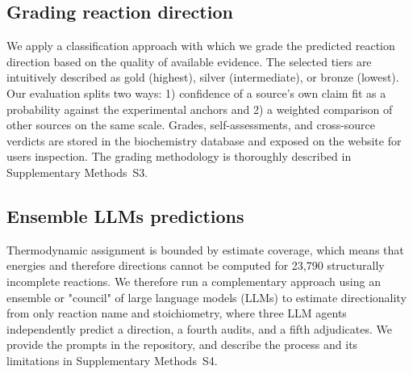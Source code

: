 \subsection{Grading reaction direction}\label{sec:methods-grading}

We apply a classification approach with which we grade the predicted reaction direction based on the quality of available evidence.
The selected tiers are intuitively described as gold (highest), silver (intermediate), or bronze (lowest).
Our evaluation splits two ways: 1) confidence of a source's own claim fit as a probability against the experimental anchors and 2) a weighted comparison of other sources on the same scale.
Grades, self-assessments, and cross-source verdicts are stored in the biochemistry database and exposed on the website for users inspection.
The grading methodology is thoroughly described in Supplementary Methods~S3.

\subsection{Ensemble LLMs predictions}\label{sec:llm-grading}
Thermodynamic assignment is bounded by estimate coverage, which means that energies and therefore directions cannot be computed for 23,790 structurally incomplete reactions.
We therefore run a complementary approach using an ensemble or "council" of large language models (LLMs) to estimate directionality from only reaction name and stoichiometry, where three LLM agents independently predict a direction, a fourth audits, and a fifth adjudicates.
We provide the prompts in the repository, and describe the process and its limitations in Supplementary Methods~S4.